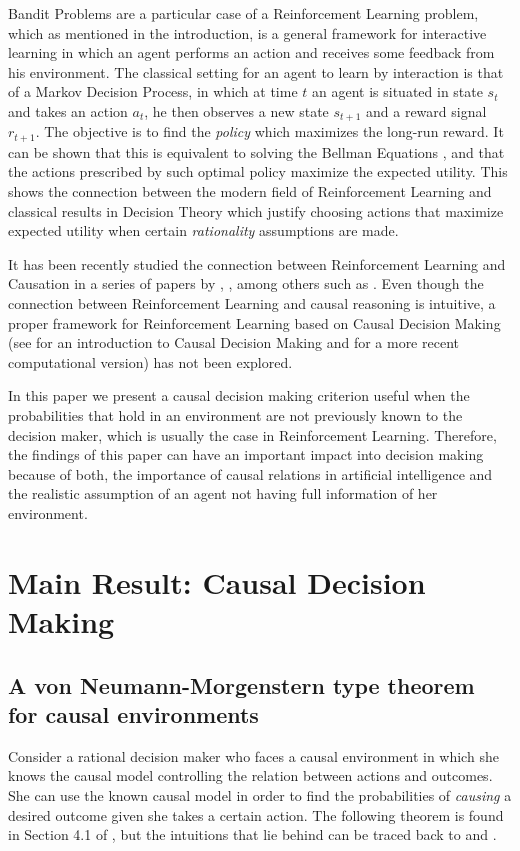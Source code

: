\documentclass[review]{elsarticle}
\begin{document}
Bandit Problems are a particular case of a Reinforcement Learning problem, which as mentioned in the introduction, is a general framework for interactive learning in which an agent performs an action and receives some feedback from his environment. The classical setting for an agent to learn by interaction is that of a Markov Decision Process, in which at time $t$ an agent is situated in state $s_t$ and takes an action $a_t$, he then observes a new state $s_{t+1}$ and a reward signal $r_{t+1}$. The objective is to find the \textit{policy} which maximizes the long-run reward. It can be shown that this is equivalent to solving the Bellman Equations \citep{sutton1998reinforcement}, and that the actions prescribed by such optimal policy maximize the expected utility. This shows the connection between the modern field of Reinforcement Learning and classical results in Decision Theory which justify choosing actions that maximize expected utility when certain \textit{rationality} assumptions are made. 

It has been recently studied the connection between Reinforcement Learning and Causation in a series of papers by \cite{gershman2015reinforcement}, \cite{lattimoreNIPS2016}, \cite{bareinboim2015bandits} among others such as \citep{zhang2016markov, zhang2017transfer, lee2019structural, correa2019statistical, zhang2019near}. Even though the connection between Reinforcement Learning and causal reasoning is intuitive, a proper  framework for Reinforcement Learning based on Causal Decision Making (see \cite{joyce1999foundations} for an introduction to Causal Decision Making and \cite{pearl2009causality} for a more recent computational version) has not been explored. 

In this paper we present a causal decision making criterion useful when the probabilities that hold in an environment are not previously known to the decision maker, which is usually the case in Reinforcement Learning. Therefore, the findings of this paper can have an important impact into decision making because of both, the importance of causal relations in artificial intelligence and the realistic assumption of an agent not having full information of her environment. 

\section{Main Result: Causal Decision Making}
\label{causal_results}
\subsection{A von Neumann-Morgenstern type theorem for causal environments}
Consider a rational decision maker who faces a causal environment in which she knows the causal model controlling the relation between actions and outcomes. She can use the known causal model in order to find the probabilities of \textit{causing} a desired outcome given she takes a certain action. The following theorem is found in Section 4.1 of \cite{pearl2009causality}, but the intuitions that lie behind can be traced back to \cite{lewis1981causal} and \cite{joyce1999foundations}.
\end{document}

